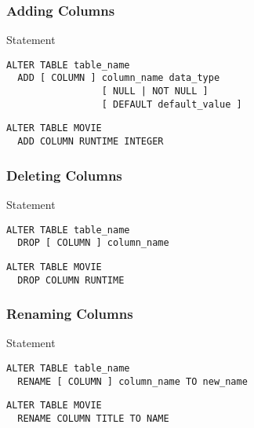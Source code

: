 \documentclass[dvipsnames]{beamer}
\theoremstyle{plain}
\begin{document}
\begin{frame}[fragile]
  \frametitle{Adding Columns}

  \begin{block}{Statement}
    \begin{lstlisting}
ALTER TABLE table_name
  ADD [ COLUMN ] column_name data_type
                 [ NULL | NOT NULL ]
                 [ DEFAULT default_value ]
    \end{lstlisting}
  \end{block}

  \pause
  \medskip
  \begin{example}
    \begin{lstlisting}
ALTER TABLE MOVIE
  ADD COLUMN RUNTIME INTEGER
    \end{lstlisting}
  \end{example}
\end{frame}

\begin{frame}[fragile]
  \frametitle{Deleting Columns}

  \begin{block}{Statement}
    \begin{lstlisting}
ALTER TABLE table_name
  DROP [ COLUMN ] column_name
    \end{lstlisting}
  \end{block}

  \pause
  \medskip
  \begin{example}
    \begin{lstlisting}
ALTER TABLE MOVIE
  DROP COLUMN RUNTIME
    \end{lstlisting}
  \end{example}
\end{frame}

\begin{frame}[fragile]
  \frametitle{Renaming Columns}

  \begin{block}{Statement}
    \begin{lstlisting}
ALTER TABLE table_name
  RENAME [ COLUMN ] column_name TO new_name
    \end{lstlisting}
  \end{block}

  \pause
  \medskip
  \begin{example}
    \begin{lstlisting}
ALTER TABLE MOVIE
  RENAME COLUMN TITLE TO NAME
    \end{lstlisting}
  \end{example}
\end{frame}
\end{document}
